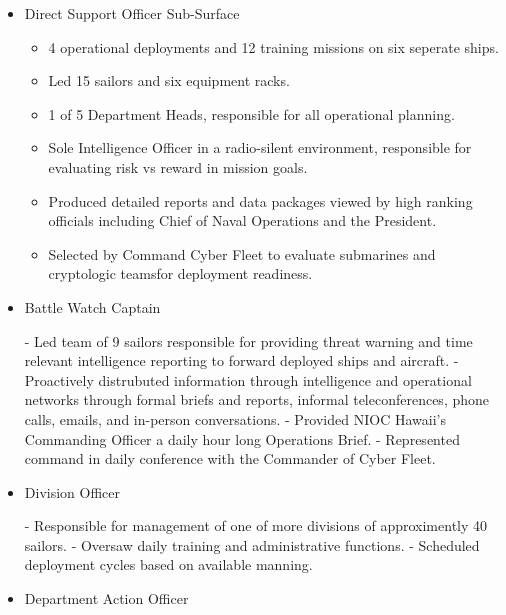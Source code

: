 \documentclass[line, margin]{resume}
\begin{document}
\begin{resume}
  \begin{position}
    \begin{itemize}
    \item Direct Support Officer Sub-Surface
      \begin{itemize}
       \item 4 operational deployments and 12 training missions on six seperate ships.
       \item Led 15 sailors and six equipment racks.
       \item 1 of 5 Department Heads, responsible for all operational planning.
       \item Sole Intelligence Officer in a radio-silent environment, responsible for evaluating risk vs reward in mission goals.
       \item Produced detailed reports and data packages viewed by high ranking officials including Chief of Naval Operations and the President.
       \item Selected by Command Cyber Fleet to evaluate submarines and cryptologic teamsfor deployment readiness. 
      \end{itemize}
    \item Battle Watch Captain
      \begin{itemize}
- Led team of 9 sailors responsible for providing threat warning and time relevant intelligence reporting to forward deployed ships and aircraft.
- Proactively distrubuted information through intelligence and operational networks through formal briefs and reports, informal teleconferences, phone calls, emails, and in-person conversations.
- Provided NIOC Hawaii's Commanding Officer a daily hour long Operations Brief.
- Represented command in daily conference with the Commander of Cyber Fleet.
      \end{itemize}
    \item Division Officer
      \begin{itemize}
- Responsible for management of one of more divisions of approximently 40 sailors.
- Oversaw daily training and administrative functions.
- Scheduled deployment cycles based on available manning.
      \end{itemize}
    \item Department Action Officer
      \begin{itemize}

      \end{itemize}
    \end{itemize}
  \end{position}
  

\end{resume}
\end{document}
